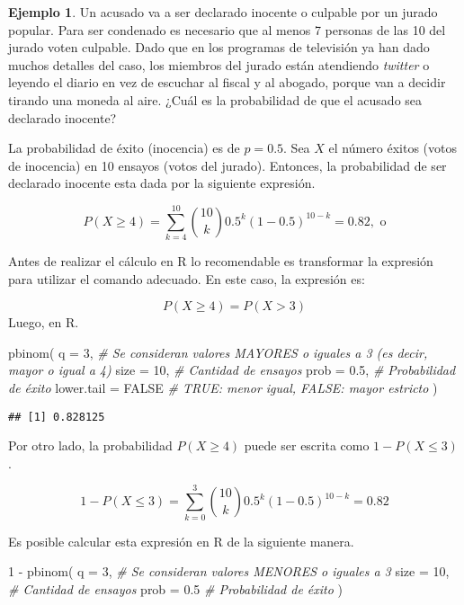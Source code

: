 \documentclass[
]{book}
\newenvironment{Shaded}{\begin{snugshade}}{\end{snugshade}}
\newcommand{\AttributeTok}[1]{\textcolor[rgb]{0.77,0.63,0.00}{#1}}
\newcommand{\CommentTok}[1]{\textcolor[rgb]{0.56,0.35,0.01}{\textit{#1}}}
\newcommand{\ConstantTok}[1]{\textcolor[rgb]{0.00,0.00,0.00}{#1}}
\newcommand{\DecValTok}[1]{\textcolor[rgb]{0.00,0.00,0.81}{#1}}
\newcommand{\FloatTok}[1]{\textcolor[rgb]{0.00,0.00,0.81}{#1}}
\newcommand{\FunctionTok}[1]{\textcolor[rgb]{0.00,0.00,0.00}{#1}}
\newcommand{\NormalTok}[1]{#1}
\newcommand{\SpecialCharTok}[1]{\textcolor[rgb]{0.00,0.00,0.00}{#1}}
\theoremstyle{definition}
\theoremstyle{definition}
\newtheorem{example}{Ejemplo}[chapter]
\theoremstyle{definition}
\theoremstyle{definition}
\theoremstyle{remark}
\begin{document}
\begin{example}
Un acusado va a ser declarado inocente o culpable por un jurado popular. Para ser condenado es necesario que al menos 7 personas de las 10 del jurado voten culpable. Dado que en los programas de televisión ya han dado muchos detalles del caso, los miembros del jurado están atendiendo \textit{twitter} o leyendo el diario en vez de escuchar al fiscal y al abogado, porque van a decidir tirando una moneda al aire. ¿Cuál es la probabilidad de que el acusado sea declarado inocente?

La probabilidad de éxito (inocencia) es de \(p = 0.5\). Sea \(X\) el número éxitos (votos de inocencia) en 10 ensayos (votos del jurado). Entonces, la probabilidad de ser declarado inocente esta dada por la siguiente expresión.

\[
P(X \geq 4) = \sum_{k=4}^{10} \binom{10}{k} 0.5^{k}(1-0.5)^{10-k} = 0.82,\text{ o}
\]

Antes de realizar el cálculo en R lo recomendable es transformar la expresión para utilizar el comando adecuado. En este caso, la expresión es:

\[P(X\geq 4) = P(X > 3)\]
Luego, en R.

\begin{Shaded}
\begin{Highlighting}[]
\FunctionTok{pbinom}\NormalTok{(}
  \AttributeTok{q =} \DecValTok{3}\NormalTok{, }\CommentTok{\# Se consideran valores MAYORES o iguales a 3 (es decir, mayor o igual a 4)}
  \AttributeTok{size =} \DecValTok{10}\NormalTok{, }\CommentTok{\# Cantidad de ensayos}
  \AttributeTok{prob =} \FloatTok{0.5}\NormalTok{, }\CommentTok{\# Probabilidad de éxito}
  \AttributeTok{lower.tail =} \ConstantTok{FALSE} \CommentTok{\# TRUE: menor igual, FALSE: mayor estricto}
\NormalTok{)}
\end{Highlighting}
\end{Shaded}

\begin{verbatim}
## [1] 0.828125
\end{verbatim}

Por otro lado, la probabilidad \(P(X\geq 4)\) puede ser escrita como \(1 - P(X \leq 3)\).

\[
1 - P(X \leq 3) = \sum_{k=0}^{3} \binom{10}{k} 0.5^{k}(1-0.5)^{10-k} = 0.82
\]

Es posible calcular esta expresión en R de la siguiente manera.

\begin{Shaded}
\begin{Highlighting}[]
\DecValTok{1} \SpecialCharTok{{-}} \FunctionTok{pbinom}\NormalTok{(}
  \AttributeTok{q =} \DecValTok{3}\NormalTok{, }\CommentTok{\# Se consideran valores MENORES o iguales a 3}
  \AttributeTok{size =} \DecValTok{10}\NormalTok{, }\CommentTok{\# Cantidad de ensayos}
  \AttributeTok{prob =} \FloatTok{0.5} \CommentTok{\# Probabilidad de éxito}
\NormalTok{)}
\end{Highlighting}
\end{Shaded}


\end{example}
\end{document}
